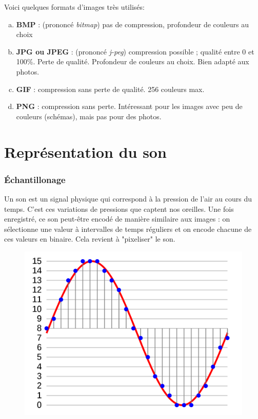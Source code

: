 \documentclass[11pt, a4paper]{book}
\begin{document}
Voici quelques formats d'images très utilisés:
\begin{enumerate}[a)]

\item {\bf BMP} : (prononcé {\it bitmap})	pas de compression, profondeur de couleurs au choix
\item {\bf JPG ou JPEG} : (prononcé {\it j-peg})	compression possible ; qualité entre 0 et 100\%. Perte de qualité. Profondeur de 
couleurs au choix. Bien adapté aux photos.
\item {\bf GIF} :	compression sans perte de qualité. 256 couleurs max.
\item {\bf PNG} :	compression sans perte. Intéressant pour les images avec peu de couleurs 
(schémas), mais pas pour des photos.

\end{enumerate}


\section{Représentation du son}
\subsubsection{Échantillonage}

Un son est un signal physique qui correspond à la pression de l'air au cours du temps. C'est ces variations de pressions que captent nos oreilles. Une fois enregistré, ce son peut-être encodé de manière similaire aux images : on sélectionne une valeur à intervalles de temps réguliers et on encode chacune de ces valeurs en binaire. Cela revient à "pixeliser" le son.


\begin{center}
\begin{figure}[h!]
\includegraphics[width=12cm]{images/son}
\end{figure}
\end{center}
\end{document}
